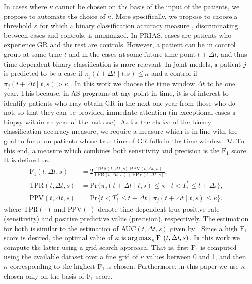 In cases where $\kappa$ cannot be chosen on the basis of the input of the patients, we propose to automate the choice of $\kappa$. More specifically, we propose to choose a threshold $\kappa$ for which a binary classification accuracy measure \citep{lopez2014optimalcutpoints}, discriminating between cases and controls, is maximized. In PRIAS, cases are patients who experience GR and the rest are controls. However, a patient can be in control group at some time $t$ and in the cases at some future time point $t + \Delta t$, and thus time dependent binary classification is more relevant. In joint models, a patient $j$ is predicted to be a case if $\pi_j(t + \Delta t \mid t,s) \leq \kappa$ and a control if $\pi_j(t + \Delta t \mid t,s) > \kappa$ \citep*{rizopoulosJMbayes, landmarking2017}. In this work we choose the time window $\Delta t$ to be one year. This because, in AS programs at any point in time, it is of interest to identify patients who may obtain GR in the next one year from those who do not, so that they can be provided immediate attention (in exceptional cases a biopsy within an year of the last one). As for the choice of the binary classification accuracy measure, we require a measure which is in line with the goal to focus on patients whose true time of GR falls in the time window $\Delta t$. To this end, a measure which combines both sensitivity and precision is the $\mbox{F}_1$ score. It is defined as:
\begin{align*}
\mbox{F}_1(t, \Delta t, s) &= 2\frac{\mbox{TPR}(t, \Delta t, s)\ \mbox{PPV}(t, \Delta t, s)}{\mbox{TPR}(t, \Delta t, s) + \mbox{PPV}(t, \Delta t, s)},\\
\mbox{TPR}(t, \Delta t, s) &= \mbox{Pr}\big\{\pi_j(t + \Delta t \mid t,s) \leq \kappa \mid t < T^*_i \leq t + \Delta t\big\},\\
\mbox{PPV}(t, \Delta t, s) &= \mbox{Pr}\big\{t < T^*_i \leq t + \Delta t \mid \pi_j(t + \Delta t \mid t,s) \leq \kappa \big\}.
\end{align*}
where $\mbox{TPR}(\cdot)$ and $\mbox{PPV}(\cdot)$ denote time dependent true positive rate (sensitivity) and positive predictive value (precision), respectively. The estimation for both is similar to the estimation of $\mbox{AUC}(t, \Delta t, s)$ given by \citet{landmarking2017}. Since a high $\mbox{F}_1$ score is desired, the optimal value of $\kappa$ is $\operatorname{arg\,max}_{\kappa} \mbox{F}_1(t, \Delta t, s)$. In this work we compute the latter using a grid search approach. That is, first $\mbox{F}_1$ is computed using the available dataset over a fine grid of $\kappa$ values between 0 and 1, and then $\kappa$ corresponding to the highest $\mbox{F}_1$ is chosen. Furthermore, in this paper we use $\kappa$ chosen only on the basis of $\mbox{F}_1$ score.